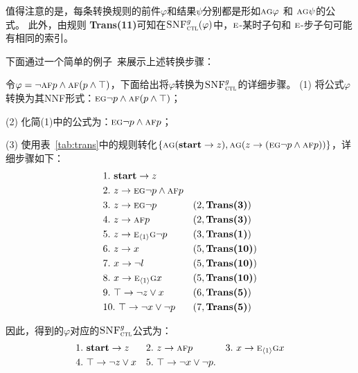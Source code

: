值得注意的是，每条转换规则的前件$\varphi$和结果$\psi$分别都是形如$\textsc{a}\textsc{g}\varphi$ 和 $\textsc{a}\textsc{g}\psi$的公式。
此外，由规则 \textbf{Trans(11)}可知在${\textsc{SNF}_{\textsc{ctl}}^g}(\varphi)$中，$\textsc{e}$-某时子句和 $\textsc{e}$-步子句可能有相同的索引。


下面通过一个简单的例子~\cite{zhang2014resolution}来展示上述转换步骤：
\begin{example}\label{exmp:transbot}
	令$\varphi=\neg \textsc{a} \textsc{f} p \wedge \textsc{a}\textsc{f}(p \wedge \top)$，下面给出将$\varphi$转换为${\textsc{SNF}_{\textsc{ctl}}^g}$的详细步骤。
	(1) 将公式$\varphi$转换为其NNF形式：$\textsc{e}\textsc{g} \neg p \wedge \textsc{a}\textsc{f}(p \wedge \top)$；
	
	(2) 化简(1)中的公式为：$\textsc{e}\textsc{g} \neg p \wedge \textsc{a}\textsc{f} p$；
	
	(3) 使用表~\ref{tab:trans}中的规则转化$\{\textsc{a}\textsc{g}(\textbf{start} \rightarrow z), \textsc{a}\textsc{g}(z \rightarrow (\textsc{e}\textsc{g} \neg p \wedge \textsc{a}\textsc{f} p))\}$，详细步骤如下：
	\begin{align*}
		&1.\ \textbf{start} \rightarrow z && \\
		&2.\ z \rightarrow \textsc{e}\textsc{g} \neg p \wedge \textsc{a}\textsc{f} p &&  \\
		&3.\ z \rightarrow  \textsc{e}\textsc{g} \neg p && (2, \textbf{Trans(3)})\\
		&4.\ z \rightarrow \textsc{a}\textsc{f} p && (2, \textbf{Trans(3)})\\
		&5.\ z \rightarrow  \textsc{e}_{{\langle{1}\rangle}}\textsc{g} \neg p  && (3, \textbf{Trans(1)})\\
		&6.\ z \rightarrow x && (5, \textbf{Trans(10)})\\
		&7.\ x\rightarrow \neg l && (5, \textbf{Trans(10)})\\
		&8.\ x\rightarrow \textsc{e}_{{\langle{1}\rangle}} \textsc{g} x&& (5, \textbf{Trans(10)})\\
		&9.\ \top \rightarrow \neg z \vee x && (6, \textbf{Trans(5)}) \\
		&10.\ \top \rightarrow \neg x \vee \neg p && (7, \textbf{Trans(5)}) 
	\end{align*}

因此，得到的$\varphi$对应的${\textsc{SNF}_{\textsc{ctl}}^g}$公式为：
\begin{align*}
	&1.\ \textbf{start} \rightarrow z && 2.\ z \rightarrow \textsc{a}\textsc{f} p && 3.\ x\rightarrow \textsc{e}_{{\langle{1}\rangle}} \textsc{g} x\\
	&4.\ \top \rightarrow \neg z \vee x && 5.\ \top \rightarrow \neg x \vee \neg p.
\end{align*}
\end{example}






